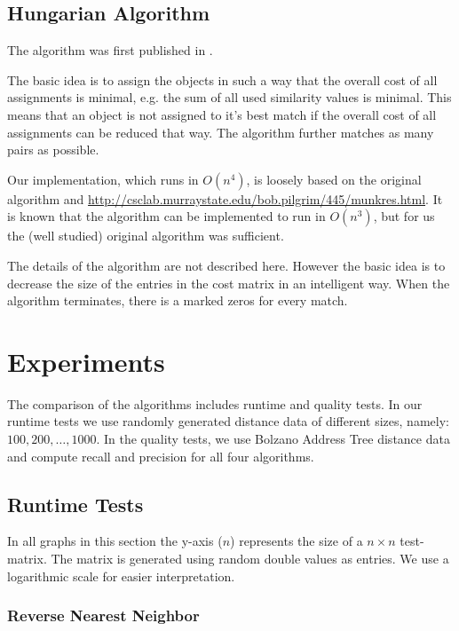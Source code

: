 \documentclass[a4paper,11pt]{article}
\begin{document}
\subsection{Hungarian Algorithm}

The algorithm was first published in \cite{ha_firstpub}.

The basic idea is to assign the objects in such a way that the overall cost of all assignments is minimal, e.g. the sum of all used similarity values is minimal. This means that an object is not assigned to it's best match if the overall cost of all assignments can be reduced that way. The algorithm further matches as many pairs as possible.

Our implementation, which runs in $O(n^4)$, is loosely based on the original algorithm and  \url{http://csclab.murraystate.edu/bob.pilgrim/445/munkres.html}. It is known that the algorithm can be implemented to run in $O(n^3)$, but for us the (well studied) original algorithm was sufficient.

The details of the algorithm are not described here. However the basic idea is to decrease the size of the entries in the cost matrix in an intelligent way. When the algorithm terminates, there is a marked zeros for every match. 

\section{Experiments}

The comparison of the algorithms includes runtime and quality tests. In our runtime tests we use randomly generated distance data of different sizes, namely: $100, 200, \dots, 1000$. In the quality tests, we use Bolzano Address Tree distance data and compute recall and precision for all four algorithms.

\subsection{Runtime Tests}

In all graphs in this section the y-axis ($n$) represents the size of a $n \times n$ test-matrix. The matrix is generated using random double values as entries. We use a logarithmic scale for easier interpretation.

\subsubsection{Reverse Nearest Neighbor}
\end{document}
